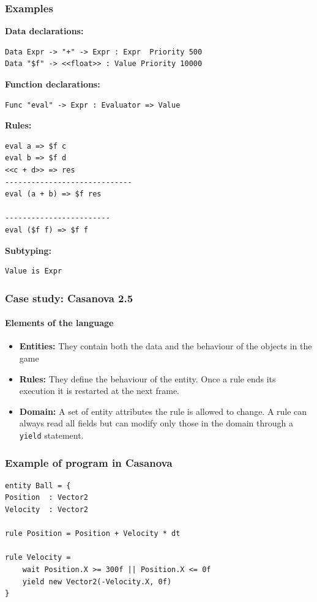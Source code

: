 \documentclass[10pt,a4paper]{beamer}
\begin{document}
\begin{frame}[fragile]
	\frametitle{Examples}
	
	\textbf{Data declarations:}
	\begin{lstlisting}
Data Expr -> "+" -> Expr : Expr  Priority 500
Data "$f" -> <<float>> : Value Priority 10000
	\end{lstlisting}
	
	\textbf{Function declarations:}
	\begin{lstlisting}
Func "eval" -> Expr : Evaluator => Value
	\end{lstlisting}
	
	\textbf{Rules:}
	\begin{lstlisting}
eval a => $f c
eval b => $f d
<<c + d>> => res
-----------------------------
eval (a + b) => $f res
	
------------------------
eval ($f f) => $f f
	\end{lstlisting}
	
	\textbf{Subtyping:}
	\begin{lstlisting}
Value is Expr
	\end{lstlisting}
\end{frame}

\begin{frame}
	\frametitle{Case study: Casanova 2.5}
	\framesubtitle{Elements of the language}
	
	\begin{itemize}
		\item \textbf{Entities:} They contain both the data and the behaviour of the objects in the game
		\item \textbf{Rules:} They define the behaviour of the entity. Once a rule ends its execution it is restarted at the next frame.
		\item \textbf{Domain:} A set of entity attributes the rule is allowed to change. A rule can always read all fields but can modify only those in the domain through a \texttt{yield} statement.
	\end{itemize}
\end{frame}

\begin{frame}[fragile]
	\frametitle{Example of program in Casanova}
	\begin{lstlisting}[basicstyle = \ttfamily\small]
entity Ball = {
Position  : Vector2
Velocity  : Vector2

rule Position = Position + Velocity * dt
	
rule Velocity =
	wait Position.X >= 300f || Position.X <= 0f
	yield new Vector2(-Velocity.X, 0f)
}
	\end{lstlisting}
\end{frame}
\end{document}
